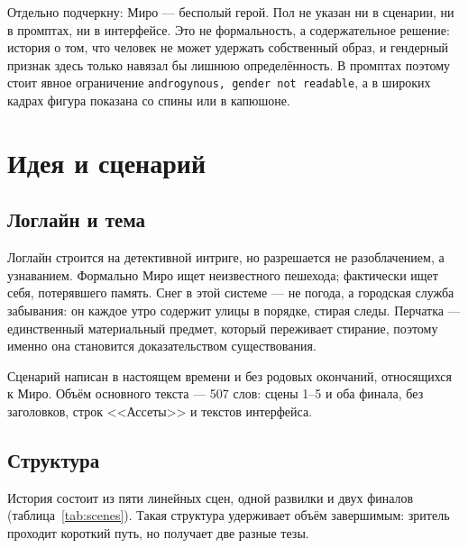 \documentclass[12pt, a4paper]{article}
\begin{document}
Отдельно подчеркну: Миро --- бесполый герой. Пол не указан ни в сценарии, ни в промптах, ни в интерфейсе. Это не формальность, а содержательное решение: история о том, что человек не может удержать собственный образ, и гендерный признак здесь только навязал бы лишнюю определённость. В промптах поэтому стоит явное ограничение \texttt{androgynous, gender not readable}, а в широких кадрах фигура показана со спины или в капюшоне.

\section{Идея и сценарий}

\subsection{Логлайн и тема}
Логлайн строится на детективной интриге, но разрешается не разоблачением, а узнаванием. Формально Миро ищет неизвестного пешехода; фактически ищет себя, потерявшего память. Снег в этой системе --- не погода, а городская служба забывания: он каждое утро содержит улицы в порядке, стирая следы. Перчатка --- единственный материальный предмет, который переживает стирание, поэтому именно она становится доказательством существования.

Сценарий написан в настоящем времени и без родовых окончаний, относящихся к Миро. Объём основного текста --- 507 слов: сцены 1--5 и оба финала, без заголовков, строк <<Ассеты>> и текстов интерфейса.

\subsection{Структура}
История состоит из пяти линейных сцен, одной развилки и двух финалов (таблица~\ref{tab:scenes}). Такая структура удерживает объём завершимым: зритель проходит короткий путь, но получает две разные тезы.
\end{document}
